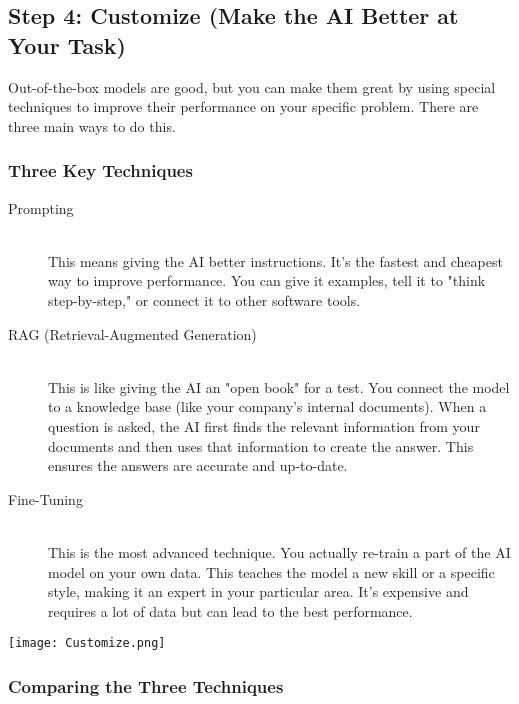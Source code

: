 \documentclass[a4paper, 12pt]{article}
\begin{document}
\subsection*{Step 4: Customize (Make the AI Better at Your Task)}
Out-of-the-box models are good, but you can make them great by using special techniques to improve their performance on your specific problem. There are three main ways to do this.

\subsubsection*{Three Key Techniques}

\begin{description}
    \item[Prompting] \hfill \\
    This means giving the AI better instructions. It's the fastest and cheapest way to improve performance. You can give it examples, tell it to "think step-by-step," or connect it to other software tools.
    \item[RAG (Retrieval-Augmented Generation)] \hfill \\
    This is like giving the AI an "open book" for a test. You connect the model to a knowledge base (like your company's internal documents). When a question is asked, the AI first finds the relevant information from your documents and then uses that information to create the answer. This ensures the answers are accurate and up-to-date.
    \item[Fine-Tuning] \hfill \\
    This is the most advanced technique. You actually re-train a part of the AI model on your own data. This teaches the model a new skill or a specific style, making it an expert in your particular area. It's expensive and requires a lot of data but can lead to the best performance.
\end{description}
\begin{center}
\texttt{[image: Customize.png]}
\end{center}
\newpage
\subsubsection*{Comparing the Three Techniques}
\end{document}
